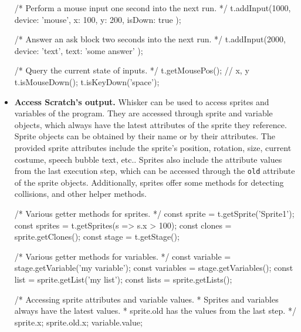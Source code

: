 \begin{itemize}
\begin{javascriptcode}
            /* Perform a mouse input one second into the next run. */
            t.addInput(1000, { device: 'mouse', x: 100, y: 200, isDown: true });

            /* Answer an ask block two seconds into the next run. */
            t.addInput(2000, { device: 'text', text: 'some answer' });

            /* Query the current state of inputs. */
            t.getMousePos(); // {x, y}
            t.isMouseDown();
            t.isKeyDown('space');
        \end{javascriptcode}
    \item \textbf{Access Scratch's output.}
        Whisker can be used to access sprites and variables of the program.
        They are accessed through sprite and variable objects, which always have the latest attributes of the sprite they reference.
        Sprite objects can be obtained by their name or by their attributes.
        The provided sprite attributes include the sprite's position, rotation, size, current costume, speech bubble text, etc..
        Sprites also include the attribute values from the last execution step,
        which can be accessed through the \texttt{old} attribute of the sprite objects.
        Additionally, sprites offer some methods for detecting collisions, and other helper methods.
        \begin{javascriptcode}
            /* Various getter methods for sprites. */
            const sprite = t.getSprite('Sprite1');
            const sprites = t.getSprites(s => s.x > 100);
            const clones = sprite.getClones();
            const stage = t.getStage();

            /* Various getter methods for variables. */
            const variable = stage.getVariable('my variable');
            const variables = stage.getVariables();
            const list = sprite.getList('my list');
            const lists = sprite.getLists();

            /* Accessing sprite attributes and variable values.
             * Sprites and variables always have the latest values.
             * sprite.old has the values from the last step. */
            sprite.x;
            sprite.old.x;
            variable.value;


\end{javascriptcode}
\end{itemize}
